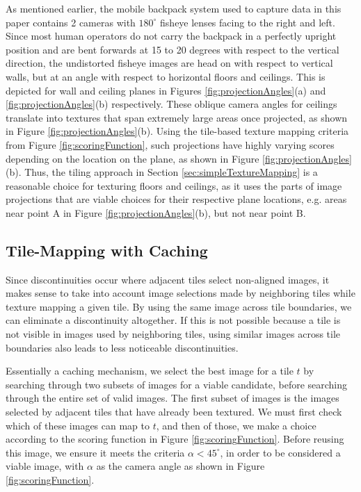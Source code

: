 \documentclass[]{spie}  %
\begin{document}
As mentioned earlier, the mobile backpack system used to capture data
in this paper contains 2 cameras with $180^\circ$ fisheye lenses
facing to the right and left. Since most human operators do not carry
the backpack in a perfectly upright position and are bent forwards at
15 to 20 degrees with respect to the vertical direction, the
undistorted fisheye images are head on with respect to vertical walls,
but at an angle with respect to horizontal floors and ceilings. This
is depicted for wall and ceiling planes in Figures
\ref{fig:projectionAngles}(a) and \ref{fig:projectionAngles}(b)
respectively. These oblique camera angles for ceilings translate into
textures that span extremely large areas once projected, as shown in
Figure \ref{fig:projectionAngles}(b). Using the tile-based texture
mapping criteria from Figure \ref{fig:scoringFunction}, such
projections have highly varying scores depending on the location on
the plane, as shown in Figure \ref{fig:projectionAngles}(b). Thus, the
tiling approach in Section \ref{sec:simpleTextureMapping} is a
reasonable choice for texturing floors and ceilings, as it uses the
parts of image projections that are viable choices for their
respective plane locations, e.g. areas near point A in Figure
\ref{fig:projectionAngles}(b), but not near point B.

\subsection{Tile-Mapping with Caching}
\label{sec:mappingWithCaching}
Since discontinuities occur where adjacent tiles select non-aligned
images, it makes sense to take into account image selections made by
neighboring tiles while texture mapping a given tile. By using the
same image across tile boundaries, we can eliminate a discontinuity
altogether. If this is not possible because a tile is not visible in
images used by neighboring tiles, using similar images across tile
boundaries also leads to less noticeable discontinuities.

Essentially a caching mechanism, we select the best image for a tile
$t$ by searching through two subsets of images for a viable candidate,
before searching through the entire set of valid images. The first
subset of images is the images selected by adjacent tiles that have
already been textured. We must first check which of these images can
map to $t$, and then of those, we make a choice according to the
scoring function in Figure \ref{fig:scoringFunction}. Before reusing
this image, we ensure it meets the criteria $\alpha < 45^\circ$, in
order to be considered a viable image, with $\alpha$ as the camera
angle as shown in Figure \ref{fig:scoringFunction}.
\end{document}
